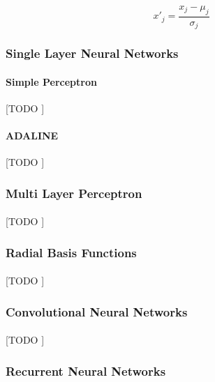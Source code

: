 \documentclass{article}
\begin{document}
			\begin{equation}
				x'_j = \frac{x_j - \mu_j}{\sigma_j}
			\end{equation}


			\subsubsection{Single Layer Neural Networks}
			\label{sec:single-layer-nn}


				\paragraph{Simple Perceptron}
				\label{sec:perceptron}
				[TODO ]

				\paragraph{ADALINE}
				\label{sec:adaline}
				[TODO ]

			\subsubsection{Multi Layer Perceptron}
			\label{sec:mlp}

				\paragraph{}
				[TODO ]

			\subsubsection{Radial Basis Functions}
			\label{sec:rbf}

				\paragraph{}
				[TODO ]

			\subsubsection{Convolutional Neural Networks}
			\label{sec:cnn}

				\paragraph{}
				[TODO ]

			\subsubsection{Recurrent Neural Networks}
			\label{sec:rnn}
\end{document}
